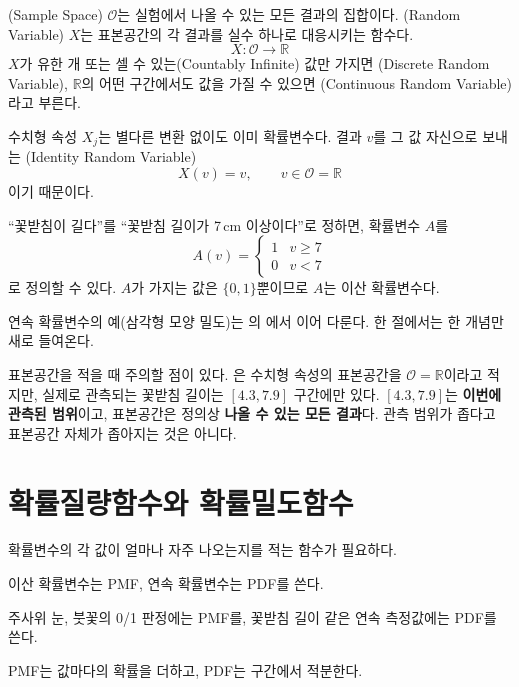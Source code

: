 \begin{definition}[확률변수]
\label{def:random-variable}
(Sample Space) $\mathcal{O}$는 실험에서 나올 수 있는 모든
결과의 집합이다. (Random Variable) $X$는 표본공간의 각
결과를 실수 하나로 대응시키는 함수다.
\[
  X : \mathcal{O} \to \mathbb{R}
\]
$X$가 유한 개 또는 셀 수 있는(Countably Infinite) 값만 가지면
(Discrete Random Variable), $\mathbb{R}$의 어떤
구간에서도 값을 가질 수 있으면 (Continuous Random
Variable)라고 부른다.
\end{definition}

수치형 속성 $X_j$는 별다른 변환 없이도 이미 확률변수다. 결과 $v$를
그 값 자신으로 보내는 (Identity Random Variable)
\[
  X(v) = v, \qquad v \in \mathcal{O} = \mathbb{R}
\]
이기 때문이다.

\begin{example}
\label{ex:iris-long-sepal}
``꽃받침이 길다''를 ``꽃받침 길이가 7\,cm 이상이다''로 정하면, 확률변수
$A$를
\[
  A(v) = \begin{cases} 1 & v \ge 7 \\ 0 & v < 7 \end{cases}
\]
로 정의할 수 있다. $A$가 가지는 값은 $\{0,1\}$뿐이므로 $A$는 이산
확률변수다.
\end{example}

연속 확률변수의 예(삼각형 모양 밀도)는 의
에서 이어 다룬다. 한 절에서는 한 개념만 새로
들여온다.

표본공간을 적을 때 주의할 점이 있다. 은
수치형 속성의 표본공간을 $\mathcal{O} = \mathbb{R}$이라고 적지만, 실제로
관측되는 꽃받침 길이는 $[4.3, 7.9]$ 구간에만 있다. $[4.3, 7.9]$는
\textbf{이번에 관측된 범위}이고, 표본공간은 정의상 \textbf{나올 수 있는
모든 결과}다. 관측 범위가 좁다고 표본공간 자체가 좁아지는 것은 아니다.

\section{확률질량함수와 확률밀도함수}
\label{sec:pmf-pdf}

\begin{inbrief}
  \item[Why] 확률변수의 각 값이 얼마나 자주 나오는지를 적는 함수가
             필요하다.
  \item[When] 이산 확률변수는 PMF, 연속 확률변수는 PDF를 쓴다.
  \item[Where] 주사위 눈, 붓꽃의 0/1 판정에는 PMF를, 꽃받침 길이 같은
               연속 측정값에는 PDF를 쓴다.
  \item[How] PMF는 값마다의 확률을 더하고, PDF는 구간에서 적분한다.
\end{inbrief}

